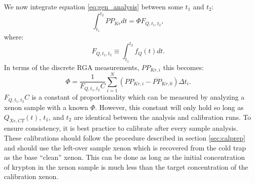 We now integrate equation \ref{eq:gen_analysis} between some $t_1$ and $t_2$:
\begin{equation}
\int_{t_1}^{t_2}PP_{Kr}dt=\Phi F_{Q,t_1,t_2},
\end{equation}
where:
\begin{equation}
F_{Q,t_1,t_2}\equiv \int_{t_1}^{t_2}f_{Q}(t) dt.
\end{equation}
In terms of the discrete RGA measurements, $PP_{Kr,i}$ this becomes:
\begin{equation}
\label{eq:int_analysis}
\Phi=\frac{1}{F_{Q,t_1,t_2}C}\sum_{i=1}^{N} (PP_{Kr,i}-\overline{PP}_{Kr,0})\Delta t_i.
\end{equation}
$F_{Q,t_1,t_2}C$ is a constant of proportionality which can be measured by analyzing a xenon sample with a known $\Phi$. However, this constant will only hold so long as $Q_{Xe,CT}(t)$, $t_1$, and $t_2$ are identical between the analysis and calibration runs. To ensure consistency, it is best practice to calibrate after every sample analysis. These calibrations should follow the procedure described in section \ref{sec:calprep} and should use the left-over sample xenon which is recovered from the cold trap as the base ``clean'' xenon. This can be done as long as the initial concentration of krypton in the xenon sample is much less than the target concentration of the calibration xenon.

